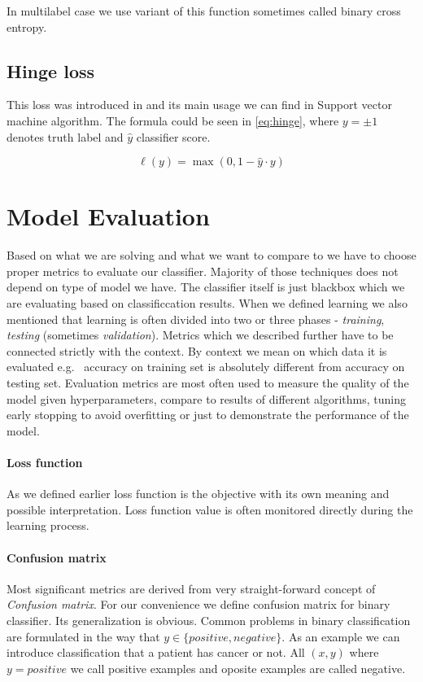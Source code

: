 In multilabel case we use variant of this function sometimes called binary cross entropy. %

\subsection{Hinge loss}
This loss was introduced in \cite{Gentile1998} and its main usage we can find in Support vector machine algorithm. The formula could be seen in \ref{eq:hinge}, where $y=\pm1$ denotes truth label and $\hat{y}$ classifier score.

\begin{equation} \label{eq:hinge}
    \ell(y)=\max(0,1-\hat{y}\cdot y)
\end{equation}

\section{Model Evaluation}
Based on what we are solving and what we want to compare to we have to choose proper metrics to evaluate our classifier. Majority of those techniques does not depend on type of model we have. The classifier itself is just blackbox which we are evaluating based on classificcation results.
When we defined learning we also mentioned that learning is often divided into two or three phases - \emph{training}, \emph{testing} (sometimes \emph{validation}). Metrics which we described further have to be connected strictly with the context. By context we mean on which data it is evaluated e.g. \ accuracy on training set is absolutely different from accuracy on testing set. 
Evaluation metrics are most often used to measure the quality of the model given hyperparameters, compare to results of different algorithms, tuning early stopping to avoid overfitting or just to demonstrate the performance of the model.

\paragraph{Loss function}
As we defined earlier loss function is the objective with its own meaning and possible interpretation. Loss function value is often monitored directly during the learning process.

\paragraph{Confusion matrix}
Most significant metrics are derived from very straight-forward concept of \emph{Confusion matrix}. For our convenience we define confusion matrix for binary classifier. Its generalization is obvious. Common problems in binary classification are formulated in the way that $y \in \{positive, negative\}$. As an example we can introduce classification that a patient has cancer or not. All $(x,y)$ where $y=positive$ we call positive examples and oposite examples are called negative.

